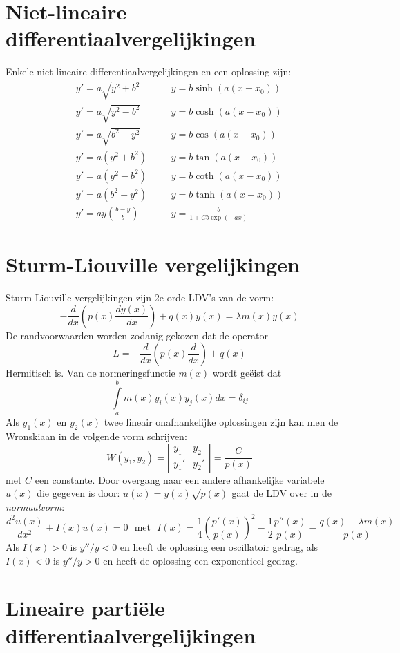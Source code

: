 \documentclass[twoside]{report}
\begin{document}
\section{Niet-lineaire differentiaalvergelijkingen}
Enkele niet-lineaire differentiaalvergelijkingen en een oplossing zijn:
\[
\begin{array}{lll}
y'=a\sqrt{y^2+b^2}&~~~~&y=b\sinh(a(x-x_0))\\
y'=a\sqrt{y^2-b^2}&~~~~&y=b\cosh(a(x-x_0))\\
y'=a\sqrt{b^2-y^2}&~~~~&y=b\cos(a(x-x_0))\\
y'=a(y^2+b^2)     &~~~~&y=b\tan(a(x-x_0))\\
y'=a(y^2-b^2)     &~~~~&y=b\coth(a(x-x_0))\\
y'=a(b^2-y^2)     &~~~~&y=b\tanh(a(x-x_0))\\
\displaystyle y'=ay\left(\frac{b-y}{b}\right)&~~~~&\displaystyle y=\frac{b}{1+Cb\exp(-ax)}
\end{array}
\]

\section{Sturm-Liouville vergelijkingen}
Sturm-Liouville vergelijkingen zijn 2e orde LDV's van de vorm:
\[
-\frac{d}{dx}\left(p(x)\frac{dy(x)}{dx}\right)+q(x)y(x)=\lambda m(x)y(x)
\]
De randvoorwaarden worden zodanig gekozen dat de operator
\[
L=-\frac{d}{dx}\left(p(x)\frac{d}{dx}\right)+q(x)
\]
Hermitisch is. Van de normeringsfunctie $m(x)$ wordt ge\"eist dat
\[
\int\limits_a^bm(x)y_i(x)y_j(x)dx=\delta_{ij}
\]
Als $y_1(x)$ en $y_2(x)$ twee lineair onafhankelijke oplossingen zijn kan men
de Wronskiaan in de volgende vorm schrijven:
\[
W(y_1,y_2)=\left|\begin{array}{cc}y_1&y_2\\ y_1'&y_2' \end{array}\right|=
\frac{C}{p(x)}
\]
met $C$ een constante. Door overgang naar een andere afhankelijke variabele
$u(x)$ die gegeven is door: $u(x)=y(x)\sqrt{p(x)}$ gaat de LDV over in de
{\it normaalvorm}:
\[
\frac{d^2u(x)}{dx^2}+I(x)u(x)=0~~~\mbox{met}~~~
I(x)=\frac{1}{4}\left(\frac{p'(x)}{p(x)}\right)^2-\frac{1}{2}\frac{p''(x)}{p(x)}-\frac{q(x)-\lambda m(x)}{p(x)}
\]
Als $I(x)>0$ is $y''/y<0$ en heeft de oplossing een oscillatoir gedrag, als
$I(x)<0$ is $y''/y>0$ en heeft de oplossing een exponentieel gedrag.

\section{Lineaire parti\"ele differentiaalvergelijkingen}
\end{document}
